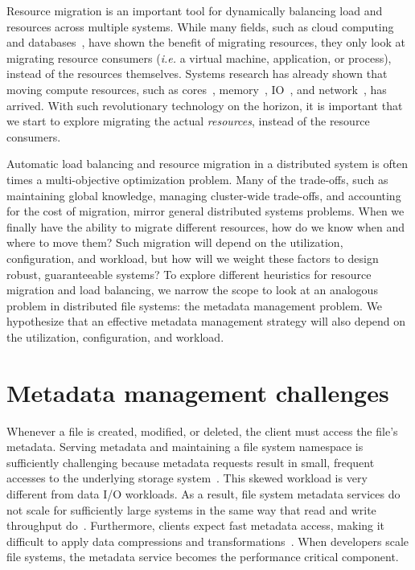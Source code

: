 
Resource migration is an important tool for dynamically balancing load and
resources across multiple systems. While many fields, such as cloud
computing~\cite{zhang:journal2010-cloud-challenges} and
databases~\cite{elmore:sigmod2013-pythia}, have shown the benefit of migrating
resources, they only look at migrating resource consumers ({\it i.e.} a virtual
machine, application, or process), instead of the resources themselves. Systems
research has already shown that moving compute resources, such as
cores~\cite{zhang:journal2010-cloud-challenges},
memory~\cite{chapman:atc2009-vnuma}, IO~\cite{raj:hpdc2007-io-virtualization},
and network~\cite{georgiadis:atn1996-network-qos}, has arrived. With such
revolutionary technology on the horizon, it is important that we start to
explore migrating the actual {\it resources}, instead of the resource
consumers.

Automatic load balancing and resource migration in a distributed system is
often times a multi-objective optimization problem. Many of the trade-offs,
such as maintaining global knowledge, managing cluster-wide trade-offs, and
accounting for the cost of migration, mirror general distributed systems
problems. When we finally have the ability to migrate different resources, how
do we know when and where to move them? Such migration will depend on the
utilization, configuration, and workload, but how will we weight these factors
to design robust, guaranteeable systems? To explore different heuristics for
resource migration and load balancing, we narrow the scope to look at an
analogous problem in distributed file systems: the metadata management problem.
We hypothesize that an effective metadata management strategy will also depend
on the utilization, configuration, and workload. 

\section{Metadata management challenges}

Whenever a file is created, modified, or deleted, the client must access the
file's metadata. Serving metadata and maintaining a file system namespace is
sufficiently challenging because metadata requests result in small, frequent
accesses to the underlying storage system~\cite{roselli:atec2000-FS-workloads}.
This skewed workload is very different from data I/O workloads. As a result,
file system metadata services do not scale for sufficiently large systems in
the same way that read and write throughput
do~\cite{abad:techreport2012-fstrace, abad:ucc2012-mimesis,
alam:pdsw2011-metadata-scaling, weil:osdi2006-ceph}. Furthermore, clients
expect fast metadata access, making it difficult to apply data compressions and
transformations~\cite{leung:atc2008-nfs-trace}. When developers scale file
systems, the metadata service becomes the performance critical component. 

